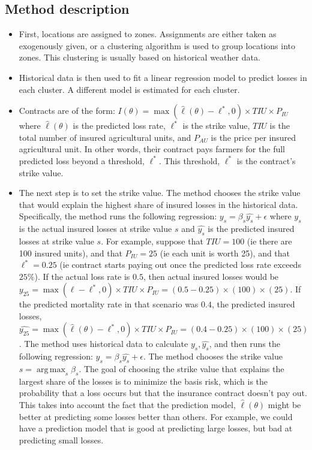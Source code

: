 \documentclass[11pt]{article}
\DeclareMathOperator*{\argmax}{arg\,max}
\begin{document}
  \subsection{Method description}
    \begin{itemize}
      \item First, locations are assigned to zones. Assignments are either taken as exogenously given, or a clustering algorithm is used to group locations into zones. This clustering is usually based on historical weather data.  
      \item Historical data is then used to fit a linear regression model to predict losses in each cluster. A different model is estimated for each cluster. 
      \item Contracts are of the form: $I(\theta) = \max(\hat{\ell}(\theta)-\ell^*,0)\times TIU \times P_{IU}$ where $\hat{\ell}(\theta)$ is the predicted loss rate, $\ell^*$ is the strike value, $TIU$ is the total number of insured agricultural units, and $P_{AU}$ is the price per insured agricultural unit.  In other words, their contract pays farmers for the full predicted loss beyond a threshold, $\ell^*$. This threshold, $\ell^*$ is the contract's strike value. 
      \item The next step is to set the strike value. The method chooses the strike value that would explain the highest share of insured losses in the historical data. Specifically, the method runs the following regression: $y_s = \beta_s \hat{y_s}+\epsilon$ where $y_s$ is the actual insured losses at strike value $s$ and $\hat{y_s}$ is the predicted insured losses at strike value $s$. For example, suppose that $TIU=100$ (ie there are 100 insured units), and that $P_{IU}=25$ (ie each unit is worth 25), and that $\ell^* = 0.25$ (ie contract starts paying out once the predicted loss rate exceeds $25\%$). If the actual loss rate is $0.5$, then actual insured losses would be $y_{25} = \max(\ell-\ell^*,0)\times TIU \times P_{IU} = (0.5-0.25)\times(100) \times (25)$. If the predicted mortality rate in that scenario was $0.4$, the predicted insured losses, $\hat{y_{25}} = \max(\hat{\ell}(\theta)-\ell^*,0)\times TIU \times P_{IU} = (0.4-0.25)\times(100) \times (25)$. The method uses historical data to calculate $y_s, \hat{y_s}$, and then runs the following regression: $y_s = \beta_s \hat{y_s}+\epsilon$. The method chooses the strike value $s= \argmax_s \beta_s$. The goal of choosing the strike value that explains the largest share of the losses is to minimize the basis risk, which is the probability that a loss occurs but that the insurance contract doesn't pay out. This takes into account the fact that the prediction model, $\hat{\ell}(\theta)$ might be better at predicting some losses better than others. For example, we could have a prediction model that is good at predicting large losses, but bad at predicting small losses. 
  \end{itemize}
\end{document}
